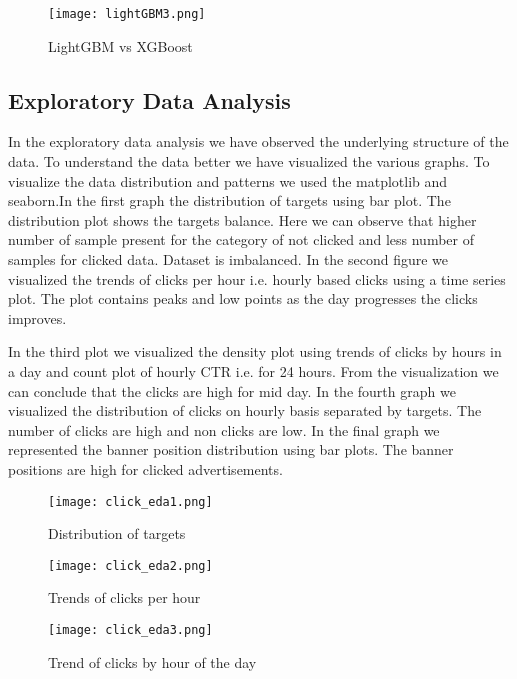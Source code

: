 \documentclass[conference]{IEEEtran}
\begin{document}
 \begin{figure}[!h]
     \centering
     \texttt{[image: lightGBM3.png]}
    \caption{LightGBM vs XGBoost}
    \label{fig:8}
 \end{figure}







\subsection{Exploratory Data Analysis}
In the exploratory data analysis we have observed the underlying structure of the data. To understand the data better we have visualized the various graphs. To visualize the data distribution and patterns we used the matplotlib and seaborn.In the first graph the distribution of targets using bar plot. The distribution plot shows the targets balance. Here we can observe that higher number of sample present for the category of not clicked and less number of samples for clicked data. Dataset is imbalanced.
In the second figure we visualized the trends of clicks per hour i.e. hourly based clicks using a time series plot. The plot contains peaks and low points as the day progresses the clicks improves.

In the third plot we visualized the density plot using trends of clicks by hours in a day and count plot of hourly CTR i.e. for 24 hours. From the visualization we can conclude that the clicks are high for mid day.
In the fourth graph we visualized the distribution of clicks on hourly basis separated by targets. The number of clicks are high and non clicks are low.
In the final graph we represented the banner position distribution using bar plots. The banner positions are high for clicked advertisements.
  \begin{figure}[!h]
     \centering
     \texttt{[image: click\_eda1.png]}
    \caption{Distribution of targets}
    \label{fig:8}
 \end{figure}


 \begin{figure}[!h]
     \centering
     \texttt{[image: click\_eda2.png]}
    \caption{Trends of clicks per hour}
    \label{fig:8}
 \end{figure}

\begin{figure}[!h]
     \centering
     \texttt{[image: click\_eda3.png]}
    \caption{Trend of clicks by hour of the day}
    \label{fig:8}
 \end{figure}
\end{document}

